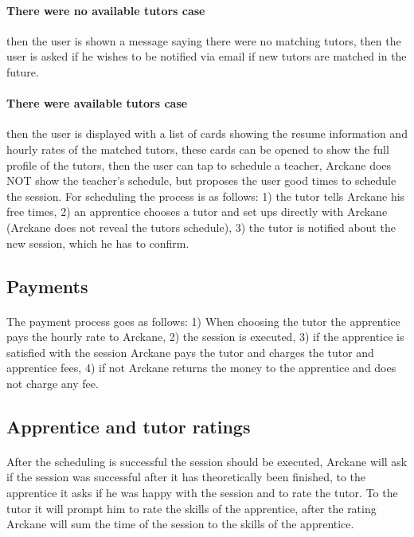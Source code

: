 \paragraph{There were no available tutors case} then the user is shown a message saying there were no matching tutors, then the user is asked if he wishes to be notified via email if  new tutors are matched in the future.

\paragraph{There were available tutors case} then the user is displayed with a list of cards showing the resume information and hourly rates of the matched tutors, these cards can be opened to show the full profile of the tutors, then the user can tap to schedule a teacher, Arckane does NOT show the teacher's schedule, but proposes the user good times to schedule the session. For scheduling the process is as follows: 1) the tutor tells Arckane his free times, 2) an apprentice chooses a tutor and set ups directly with Arckane (Arckane does not reveal the tutors schedule), 3) the tutor is notified about the new session, which he has to confirm.

\subsection{Payments}
\paragraph{} The payment process goes as follows: 1) When choosing the tutor the apprentice pays the hourly rate to Arckane, 2) the session is executed, 3) if the apprentice is satisfied with the session Arckane pays the tutor and charges the tutor and apprentice fees, 4) if not Arckane returns the money to the apprentice and does not charge any fee.

\subsection{Apprentice and tutor ratings}
\paragraph{} After the scheduling is successful the session should be executed, Arckane will ask if the session was successful after it has theoretically been finished, to the apprentice it asks if he was happy with the session and to rate the tutor. To the tutor it will prompt him to rate the skills of the apprentice, after the rating Arckane will sum the time of the session to the skills of the apprentice.

